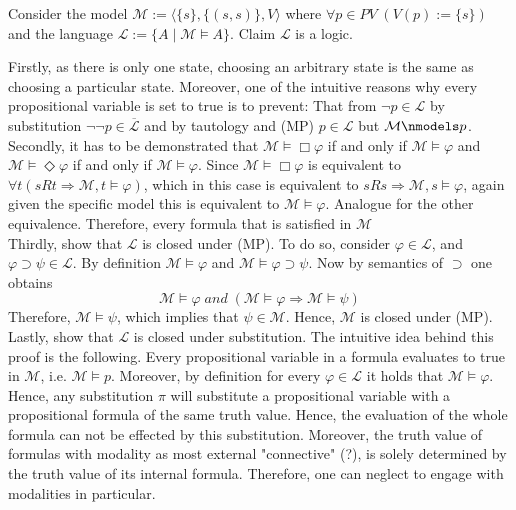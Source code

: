 \documentclass[11pt,a4paper]{article}
\newcommand{\lto}{\supset}
\newcommand{\some}{\Diamond}
\newcommand{\all}{\Box}
\newcommand{\sand}{\; and \;}
\newcommand{\sto}{\Rightarrow}
\begin{document}
Consider the model $\mathcal{M}:= \langle \{s\}, \{(s,s)\}, V\rangle$ where $\forall p \in PV \; (V(p):=\{s\})$ and the language $\mathcal{L}:=\{A \mid \mathcal{M} \models A\}$. Claim $\mathcal{L}$ is a logic.

Firstly, as there is only one state, choosing an arbitrary state is the same as choosing a particular state. Moreover, one of the intuitive reasons why every propositional variable is set to true is to prevent: That from $\neg p \in \mathcal{L}$ by substitution $\neg \neg p \in \overline{\mathcal{L}}$ and by tautology and (MP) $p \in \mathcal{L}$ but $\mathcal{M} \nmodels p$.  \\

Secondly, it has to be demonstrated that $\mathcal{M} \models \all \varphi$ if and 
only if $\mathcal{M} \models \varphi$ and $\mathcal{M} \models \some\varphi$ if and only if $\mathcal{M} \models \varphi$. Since $\mathcal{M} \models \all \varphi$ is equivalent to $\forall t (sRt \sto \mathcal{M},t \models \varphi)$, which in this case is equivalent to $sRs \sto \mathcal{M},s \models \varphi$, again given the specific model this is equivalent to $\mathcal{M} \models \varphi$. Analogue for the other equivalence. Therefore, every formula that is satisfied in $\mathcal{M}$ \\

Thirdly, show that $\mathcal{L}$ is closed under (MP). To do so, consider $\varphi \in \mathcal{L}$, and $\varphi \lto \psi \in \mathcal{L}$. By definition $\mathcal{M} \models \varphi$  and $\mathcal{M} \models \varphi \lto \psi$. Now by semantics of $\lto$ one obtains
\begin{equation*}
\mathcal{M} \models \varphi \sand (\mathcal{M} \models \varphi \sto \mathcal{M} \models \psi)
\end{equation*}
Therefore, $\mathcal{M} \models \psi$, which implies that $\psi \in \mathcal{M}$. Hence, $\mathcal{M}$ is closed under (MP). \\

Lastly, show that $\mathcal{L}$ is closed under substitution. The intuitive idea behind this proof is the following. Every propositional variable in a formula evaluates to true in $\mathcal{M}$, i.e. $\mathcal{M} \models p$. Moreover, by definition for every $\varphi \in \mathcal{L}$ it holds that $\mathcal{M} \models \varphi$. Hence, any substitution $\pi$ will substitute a propositional variable with a propositional formula of the same truth value. Hence, the evaluation of the whole formula can not be effected by this substitution. Moreover, the truth value of formulas with modality as most external "connective" (?), is solely determined by the truth value of its internal formula. Therefore, one can neglect to engage with modalities in particular. \\
\end{document}
